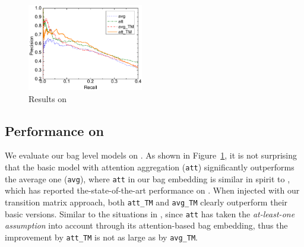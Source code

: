 \begin{figure}[t!]
\setlength{\belowcaptionskip}{-10pt}
\includegraphics[width=0.45\textwidth]{figures/re_att_avg_cmp_exp.pdf}
\caption{Results on \EntityRE}
\label{fig: Riedel_res}
\end{figure}

\subsection{Performance on \EntityRE}
We evaluate our bag level models on \EntityRE. 
As shown in Figure~\ref{fig: Riedel_res}, it is not surprising that the basic model with attention aggregation (\texttt{att}) significantly outperforms the average one (\texttt{avg}), where \texttt{att}  in our bag embedding is similar in spirit to \cite{lin2016neural},
which has reported the-state-of-the-art performance on \EntityRE.  
When injected with our transition matrix approach,  both \texttt{att\_TM} and \texttt{avg\_TM} clearly outperform their basic versions.
%
%
%
Similar to the situations in \TimeRE, since  \texttt{att} has taken the \textit{at-least-one assumption} into account  through its attention-based bag embedding, thus the improvement by \texttt{att\_TM}  is not as large as by \texttt{avg\_TM}.
